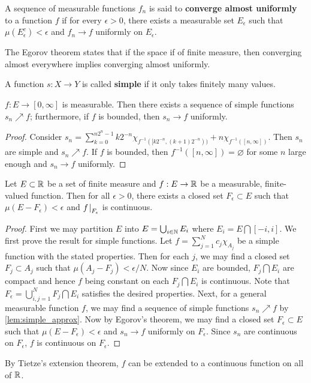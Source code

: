 \begin{definition}
    A sequence of measurable functions $f_n$ is said to \textbf{converge 
    almost uniformly} to a function $f$ if for every $\epsilon>0$, 
    there exists a measurable set $E_\epsilon$ such that $\mu(E_\epsilon^c)<\epsilon$ 
    and $f_n\to f$ uniformly on $E_\epsilon$.
\end{definition}
\begin{remark}
    The Egorov theorem states that if the space if of finite measure, 
    then converging almost everywhere implies converging almost uniformly.
\end{remark}

\begin{definition}
    A function $s:X\to Y$ is called \textbf{simple} if it only takes 
    finitely many values.
\end{definition}

\begin{lemma}\label{lem:simple_approx}
    $f:E\to[0,\infty]$ is measurable. Then there exists a sequence 
    of simple functions $s_n\nearrow f$; furthermore, if $f$ is bounded, 
    then $s_n\to f$ uniformly.
\end{lemma}
\begin{proof}
    Consider $s_n = \sum_{k=0}^{n2^n-1} k2^{-n}\chi_{f^{-1}([k2^{-n},(k+1)2^{-n}))} 
    + n\chi_{f^{-1}([n,\infty])}$. Then $s_n$ are simple and $s_n\nearrow f$. 
    If $f$ is bounded, then $f^{-1}([n,\infty])=\varnothing$ for some $n$ 
    large enough and $s_n\to f$ uniformly.
\end{proof}

\begin{theorem}[Lusin]
    Let $E\subset\mathbb{R}$ be a set of finite measure and $f:E\to\mathbb{R}$ be a measurable, 
    finite-valued function. Then for all $\epsilon>0$, there exists a 
    closed set $F_\epsilon\subset E$ such that $\mu(E-F_\epsilon)<\epsilon$ 
    and $f\left.\hspace{-0.2em}\right|_{F_\epsilon}$ is continuous.
\end{theorem}
\begin{proof}
    First we may partition $E$ into $E = \bigcup_{i\in\mathbb{N}} E_i$ where $E_i = E\bigcap[-i,i]$. 
    We first prove the result for simple functions. Let $f = \sum_{j=1}^{N}c_j\chi_{A_j}$ 
    be a simple function with the stated properties. Then for each $j$, 
    we may find a closed set $F_j\subset A_j$ such that $\mu(A_j-F_j)<\epsilon/N$. 
    Now since $E_i$ are bounded, $F_j\bigcap E_i$ are compact and hence 
    $f$ being constant on each $F_j\bigcap E_i$ is continuous. Note that 
    $F_\epsilon = \bigcup_{i,j=1}^{N} F_j\bigcap E_i$ satisfies the desired 
    properties. Next, for a general measurable function $f$, we may find 
    a sequence of simple functions $s_n\nearrow f$ by \cref{lem:simple_approx}. 
    Now by Egorov's theorem, we may find a closed set $F_\epsilon\subset E$ such 
    that $\mu(E-F_\epsilon)<\epsilon$ and $s_n\to f$ uniformly on $F_\epsilon$. 
    Since $s_n$ are continuous on $F_\epsilon$, $f$ is continuous on $F_\epsilon$.
\end{proof}
\begin{remark}
    By Tietze's extension theorem, $f$ can be extended to a continuous 
    function on all of $\mathbb{R}$.
\end{remark}

